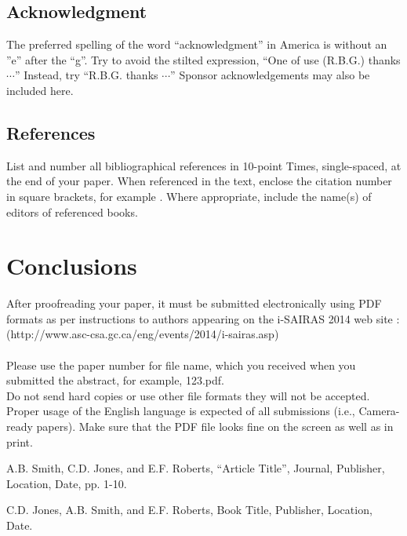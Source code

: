 \documentclass[letter,twocolumn]{article}
\begin{document}
\subsection{Acknowledgment}
The preferred spelling of the word ``acknowledgment'' in America is without an ''e'' after the ``g''. Try to avoid the stilted expression, ``One of use (R.B.G.) thanks $\cdots$'' Instead, try ``R.B.G. thanks $\cdots$'' Sponsor acknowledgements may also be included here.

\subsection{References}
List and number all bibliographical references in 10-point Times, single-spaced, at the end of your paper. When referenced in the text, enclose the citation number in square brackets, for example \cite{smith}. Where appropriate, include the name(s) of editors of referenced books.

\section{Conclusions}
After proofreading your paper, it must be submitted electronically using PDF formats as per instructions to authors appearing
on the i-SAIRAS 2014 web site :\\\indent
(http://www.asc-csa.gc.ca/eng/events/2014/i-sairas.asp)\\\noindent
\\\indent
Please use the paper number for file name, which you received when you submitted the abstract, for example, 123.pdf.\\\indent
Do not send hard copies or use other file formats they will not be accepted. Proper usage of the English language is expected of all submissions (i.e., Camera-ready papers). Make sure that the PDF file looks fine on the screen as well as in print.

\begin{thebibliography}{99}
A.B. Smith, C.D. Jones, and E.F. Roberts, ``Article Title'', Journal, Publisher, Location, Date, pp. 1-10.

\vspace{-1.5mm}
C.D. Jones, A.B. Smith, and E.F. Roberts, Book Title, Publisher, Location, Date.

\end{thebibliography}
\end{document}
